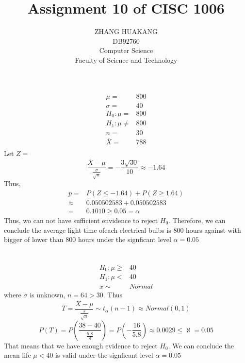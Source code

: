 \documentclass{article}
\title{Assignment 10 of CISC 1006}
\author{ZHANG HUAKANG \\ DB92760 \\Computer Science \\Faculty of Science and Technology}
\begin{document}
    \maketitle
    \section{} 
        \paragraph{}
        \begin{equation*}
            \begin{split}
                \mu=&800\\
                \sigma=&40\\
                H_0: \mu=&800\\
                H_1: \mu\neq& 800\\
                n=&30\\
                \overline{X}=&788\\
            \end{split}
        \end{equation*}
        Let $Z=$
        $$\frac{\overline{X}-\mu}{\frac{\sigma}{\sqrt{n}}}=-\frac{3\sqrt{30}}{10}\approx -1.64$$
        Thus, 
        \begin{equation*}
            \begin{split}
                p=&P(Z\leq -1.64)+P(Z\geq 1.64)\\
                    \approx&0.050502583+0.050502583\\
                    =&0.1010\geq 0.05=\alpha
            \end{split}
        \end{equation*}
        Thus, wo can not have sufficient envidence to reject $H_0$. Therefore, we can conclude the average light time ofeach electrical bulbs is $800$ hours against with bigger of lower than $800$ hours under the signficant level $\alpha=0.05$
    \section{}
        \paragraph{}
        \begin{equation*}
            \begin{split}
                H_0: \mu\geq& 40\\
                H_1: \mu < &40\\
                x\sim& Normal
            \end{split}
        \end{equation*}
        where $\sigma$ is unknown, $n=64>30$.
        Thus $$T=\frac{\overline{X}-\mu}{\frac{s}{\sqrt{n}}}\sim t_\alpha(n-1)\approx Normal(0,1)$$
        $$P(T)=P(\frac{38-40}{\frac{5.8}{8}})=P(-\frac{16}{5.8})\approx 0.0029\leq \aleph=0.05$$
        That means that we have enough evidence to reject $H_0$.
        We can conclude the mean life $\mu<40$ is valid under the signficant level $\alpha=0.05$
\end{document}
